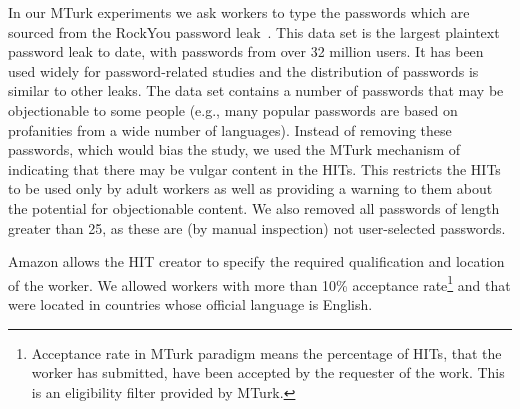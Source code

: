 



In our MTurk experiments we ask workers to type the passwords which are
sourced from the RockYou password leak~\cite{rockyou:2009}.  This data
set is the largest plaintext password leak to date, with passwords
from over 32 million users.  It has been used widely for 
password-related studies and the distribution of passwords is similar to other
leaks.  The data set contains a number of passwords that may be
objectionable to some people (e.g., many popular passwords are based
on profanities from a wide number of languages). Instead of removing
these passwords, which would bias the study, we used the MTurk
mechanism of indicating that there may be vulgar content in the
HITs. This restricts the HITs to be used only by adult workers as well
as providing a warning to them about the potential for objectionable
content. We also removed all passwords of length greater than 25, as
these are (by manual inspection) not user-selected passwords.

Amazon allows the HIT creator to specify the required qualification
and location of the worker. We allowed workers with more than 10\%
acceptance rate\footnote{Acceptance rate in MTurk paradigm
  means the percentage of HITs, that the worker has submitted, have been
  accepted by the requester of the work. This is an eligibility filter
  provided by MTurk. } and that were located in countries whose official
language is English.  %

